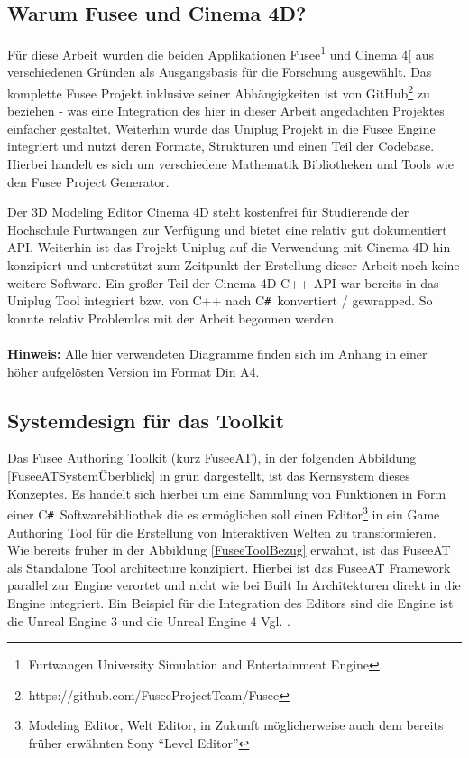 \documentclass[pagesize, paper=a4, fontsize=12pt, titlepage=true, headings=small, headnosepline, abstractoff, liststotoc, nochapterprefix, plainheadsepline, twoside]{scrreprt}
\newcommand{\CSS}{C\texttt{\# }}
\begin{document}
\subsection{Warum Fusee und Cinema 4D?}
Für diese Arbeit wurden die beiden Applikationen Fusee\footnote{Furtwangen University Simulation and Entertainment Engine} und Cinema 4[\autocite{MaxonC4d2014} aus verschiedenen Gründen als Ausgangsbasis für die Forschung ausgewählt. Das komplette Fusee Projekt inklusive seiner Abhängigkeiten ist von GitHub\footnote{https://github.com/FuseeProjectTeam/Fusee} zu beziehen - was eine Integration des hier in dieser Arbeit angedachten Projektes einfacher gestaltet. Weiterhin wurde das Uniplug Projekt in die Fusee Engine integriert und nutzt deren Formate, Strukturen und einen Teil der Codebase. Hierbei handelt es sich um verschiedene Mathematik Bibliotheken und Tools wie den Fusee Project Generator.

Der 3D Modeling Editor Cinema 4D steht kostenfrei für Studierende der Hochschule Furtwangen zur Verfügung und bietet eine relativ gut dokumentiert API. Weiterhin ist das Projekt Uniplug auf die Verwendung mit Cinema 4D hin konzipiert und unterstützt zum Zeitpunkt der Erstellung dieser Arbeit noch keine weitere Software. Ein großer Teil der Cinema 4D C++ API war bereits in das Uniplug Tool integriert bzw. von C++ nach \CSS konvertiert / gewrapped. So konnte relativ Problemlos mit der Arbeit begonnen werden.
\\
\\
\textbf{Hinweis:} Alle hier verwendeten Diagramme finden sich im Anhang in einer höher aufgelösten Version im Format Din A4.

\subsection{Systemdesign für das Toolkit}
Das Fusee Authoring Toolkit (kurz FuseeAT), in der folgenden Abbildung \ref{FuseeATSystemÜberblick} in grün dargestellt, ist das Kernsystem dieses Konzeptes. Es handelt sich hierbei um eine Sammlung von Funktionen in Form einer \CSS Softwarebibliothek die es ermöglichen soll einen Editor\footnote{Modeling Editor, Welt Editor, in Zukunft  möglicherweise auch dem bereits früher erwähnten Sony “Level Editor”} in ein Game Authoring Tool für die Erstellung von Interaktiven Welten zu transformieren. Wie bereits früher in der Abbildung \ref{FuseeToolBezug} erwähnt, ist das FuseeAT als Standalone Tool architecture konzipiert. Hierbei ist das FuseeAT Framework parallel zur Engine verortet und nicht wie bei Built In Architekturen direkt in die Engine integriert. Ein Beispiel für die Integration des Editors sind die Engine ist die Unreal Engine 3 und die Unreal Engine 4 Vgl. \parencite[S. 54-55]{Gregory2009}.
\end{document}
